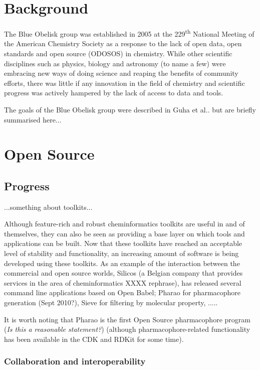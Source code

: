 \documentclass[10pt]{bmc_article}
\newenvironment{bmcformat}{\begin{raggedright}\baselineskip20pt\sloppy\setboolean{publ}{false}}{\end{raggedright}\baselineskip20pt\sloppy}
\begin{document}
\begin{bmcformat}
\section*{Background}
The Blue Obelisk group was established in 2005 at the
229\textsuperscript{th} National Meeting of the American Chemistry
Society as a response to the lack of open data, open standards and
open source (ODOSOS) in chemistry. While other scientific disciplines
such as physics, biology and astronomy (to name a few) were embracing
new ways of doing science and reaping the benefits of community
efforts, there was little if any innovation in the field of chemistry
and scientific progress was actively hampered by the lack of access to
data and tools.

The goals of the Blue Obelisk group were described in Guha et al.\cite{guha2006}. but are briefly summarised here...


\section*{Open Source}
  \subsection*{Progress}

...something about toolkits...

Although feature-rich and robust cheminformatics toolkits are useful in and of themselves, they can also be seen as providing a base layer on which tools and applications can be built. Now that these toolkits have reached an acceptable level of stability and functionality, an increasing amount of software is being developed using these toolkits. As an example of the interaction between the commercial and open source worlds, Silicos (a Belgian company that provides services in the area of cheminformatics XXXX rephrase), has released several command line applications based on Open Babel; Pharao for pharmacophore generation (Sept 2010?), Sieve for filtering by molecular property, ..... 

It is worth noting that Pharao is the first Open Source pharmacophore program (\emph{Is this a reasonable statement?}) (although pharmacophore-related functionality has been available in the CDK and RDKit for some time).

  \subsubsection*{Collaboration and interoperability}


\end{bmcformat}
\end{document}
